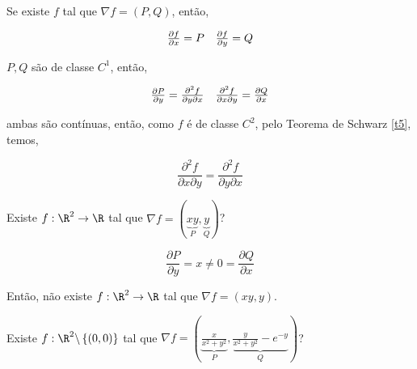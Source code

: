 \documentclass[11pt, oneside, a4paper]{gsm-l}
\begin{document}
\begin{dem}
Se existe $f$ tal que $\nabla f = \left( {P,Q} \right)$, então,

\[
\begin{array}{*{20}c}
{\frac{{\partial f}}
{{\partial x}} = P} & {\frac{{\partial f}}
{{\partial y}} = Q}  \\

\end{array}
\]

$P,Q$ são de classe $C^1$, então,

\[
\begin{array}{*{20}c}
{\frac{{\partial P}}
{{\partial y}} = \frac{{\partial ^2 f}}
{{\partial y\partial x}}} & {\frac{{\partial ^2 f}}
{{\partial x\partial y}} = \frac{{\partial Q}}
{{\partial x}}}  \\

\end{array}
\]

    ambas são contínuas, então, como $f$ é de classe $C^2$, pelo Teorema de Schwarz \ref{t5}, temos,

\[
\frac{{\partial ^2 f}}
{{\partial x\partial y}} = \frac{{\partial ^2 f}}
{{\partial y\partial x}}
\]

\end{dem}

\begin{exem}
    Existe $f:\R^2 \to \R$ tal que $\nabla f = \left( {\underbrace {xy}_P,\underbrace y_Q} \right)$?
\end{exem}

\begin{sol}
\[
\frac{{\partial P}}
{{\partial y}} = x \ne 0 = \frac{{\partial Q}}
{{\partial x}}
\]

    Então, não existe $f:\R^2 \to \R$ tal que $\nabla f = \left( {xy,y} \right)$.
\end{sol}

\begin{exem}
    Existe $f:\R^2 \backslash \left\{ {\left( {0,0} \right)} \right\}$ tal que $\nabla f = \left( {\underbrace {\frac{x}
{{x^2  + y^2 }}}_P,\underbrace {\frac{y}
{{x^2  + y^2 }} - e^{ - y} }_Q} \right)$?
\end{exem}
\end{document}
